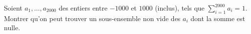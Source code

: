 Soient $a_1, \ldots, a_{2000}$ des entiers entre $-1000$ et $1000$ (inclus), tels que $\sum_{i=1}^{2000} a_i = 1$. Montrer qu'on peut trouver un sous-ensemble non vide des $a_i$ dont la somme est nulle.
